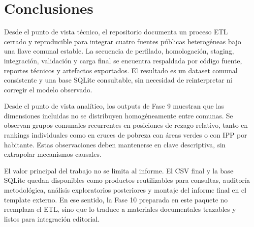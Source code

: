 \chapter{Conclusiones}

Desde el punto de vista técnico, el repositorio documenta un proceso ETL cerrado y reproducible para integrar cuatro fuentes públicas heterogéneas bajo una llave comunal estable. La secuencia de perfilado, homologación, staging, integración, validación y carga final se encuentra respaldada por código fuente, reportes técnicos y artefactos exportados. El resultado es un dataset comunal consistente y una base SQLite consultable, sin necesidad de reinterpretar ni corregir el modelo observado.

Desde el punto de vista analítico, los outputs de Fase 9 muestran que las dimensiones incluidas no se distribuyen homogéneamente entre comunas. Se observan grupos comunales recurrentes en posiciones de rezago relativo, tanto en rankings individuales como en cruces de pobreza con áreas verdes o con IPP por habitante. Estas observaciones deben mantenerse en clave descriptiva, sin extrapolar mecanismos causales.

El valor principal del trabajo no se limita al informe. El CSV final y la base SQLite quedan disponibles como productos reutilizables para consultas, auditoría metodológica, análisis exploratorios posteriores y montaje del informe final en el template externo. En ese sentido, la Fase 10 preparada en este paquete no reemplaza el ETL, sino que lo traduce a materiales documentales trazables y listos para integración editorial.
